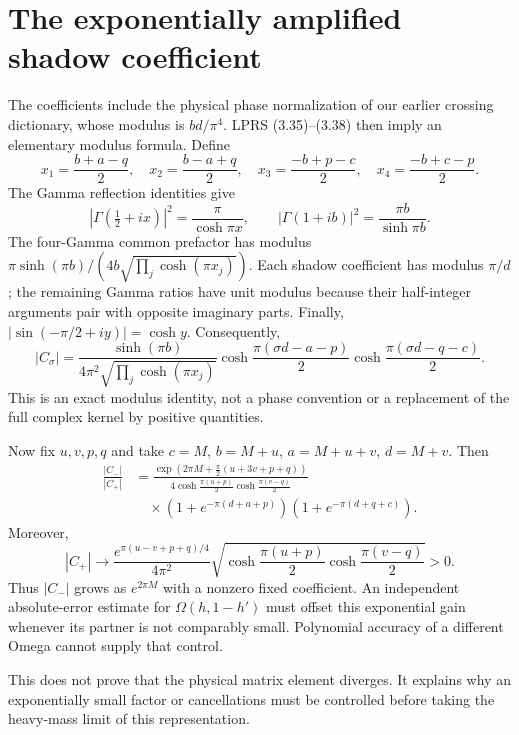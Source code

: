 \documentclass[11pt,a4paper]{article}
\newcommand{\Om}{\Omega}
\begin{document}
\newpage
\section{The exponentially amplified shadow coefficient}
The coefficients include the physical phase normalization of our earlier
crossing dictionary, whose modulus is $bd/\pi^4$.
LPRS (3.35)--(3.38) \cite{lprs} then imply an elementary modulus formula.
Define
\[
 x_1=\frac{b+a-q}{2},\quad x_2=\frac{b-a+q}{2},\quad
 x_3=\frac{-b+p-c}{2},\quad x_4=\frac{-b+c-p}{2}.
\]
The Gamma reflection identities give
\[
 |\Gamma(\tfrac12+ix)|^2=\frac{\pi}{\cosh\pi x},\qquad
 |\Gamma(1+ib)|^2=\frac{\pi b}{\sinh\pi b}.
\]
The four-Gamma common prefactor has modulus
$\pi\sinh(\pi b)/(4b\sqrt{\prod_j\cosh(\pi x_j)})$.
Each shadow coefficient has modulus $\pi/d$; the remaining Gamma
ratios have unit modulus because their half-integer arguments pair
with opposite imaginary parts. Finally,
$|\sin(-\pi/2+iy)|=\cosh y$. Consequently,
\begin{equation}
 |C_\sigma|=
 \frac{\sinh(\pi b)}
 {4\pi^2\sqrt{\prod_j\cosh(\pi x_j)}}
 \cosh\frac{\pi(\sigma d-a-p)}2
 \cosh\frac{\pi(\sigma d-q-c)}2 .
 \label{coefficient}
\end{equation}
This is an exact modulus identity, not a phase convention or a replacement
of the full complex kernel by positive quantities.

Now fix $u,v,p,q$ and take
$c=M$, $b=M+u$, $a=M+u+v$, $d=M+v$. Then
\begin{align}
 \frac{|C_-|}{|C_+|}
 &=\frac{\exp(2\pi M+\frac\pi2(u+3v+p+q))}
 {4\cosh\frac{\pi(u+p)}2\cosh\frac{\pi(v-q)}2}
 \nonumber\\[-2pt]
 &\quad\times(1+e^{-\pi(d+a+p)})(1+e^{-\pi(d+q+c)}).
 \label{amplification}
\end{align}
Moreover,
\[
 |C_+|\longrightarrow
 \frac{e^{\pi(u-v+p+q)/4}}{4\pi^2}
 \sqrt{\cosh\frac{\pi(u+p)}2\cosh\frac{\pi(v-q)}2}>0.
\]
Thus $|C_-|$ grows as $e^{2\pi M}$ with a nonzero fixed coefficient.
An independent absolute-error estimate for
$\Om(h,1-h')$ must offset this exponential gain whenever its partner
is not comparably small. Polynomial accuracy of a different Omega
cannot supply that control.

This does not prove that the physical matrix element diverges.
It explains why an exponentially small factor or cancellations must be
controlled before taking the heavy-mass limit of this representation.

\newpage
\end{document}
